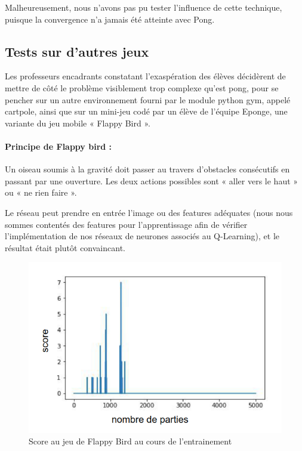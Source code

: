 \documentclass[
    10pt,
    a4paper,
    oneside,
    headinclude,footinclude,
    BCOR=5mm,
    captions=tableabove
]{scrartcl}
\begin{document}
Malheureusement, nous n'avons pas pu tester l'influence de cette technique, puisque la convergence n'a jamais été atteinte avec Pong.

\subsection{Tests sur d'autres jeux}
Les professeurs encadrants constatant l’exaspération des élèves décidèrent de mettre de côté le problème visiblement trop complexe qu’est pong, pour se pencher sur un autre environnement fourni par le module python gym, appelé cartpole, ainsi que sur un mini-jeu codé par un élève de l’équipe Eponge, une variante du jeu mobile « Flappy Bird ».

\paragraph{Principe de Flappy bird :}
Un oiseau soumis à la gravité doit passer au travers d’obstacles consécutifs en passant par une ouverture. Les deux actions possibles sont « aller vers le haut » ou « ne rien faire ».

Le réseau peut prendre en entrée l’image ou des features adéquates (nous nous sommes contentés des features pour l’apprentissage afin de vérifier l’implémentation de nos réseaux de neurones associés au Q-Learning), et le résultat était plutôt convaincant.

\begin{figure}
\includegraphics[width=\linewidth]{flappy-bird.png}
\centering
\caption{Score au jeu de Flappy Bird au cours de l'entrainement}
\label{fig:flappy-bird}
\end{figure}
\end{document}
